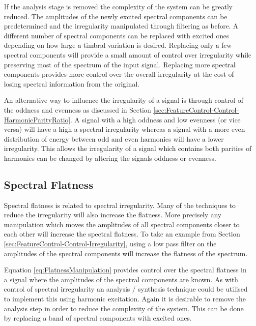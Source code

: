 		If the analysis stage is removed the complexity of the system can be greatly reduced. The amplitudes of the
		newly excited spectral components can be predetermined and the irregularity manipulated through filtering
		as before.  A different number of spectral components can be replaced with excited ones depending on how
		large a timbral variation is desired. Replacing only a few spectral components will provide a small amount
		of control over irregularity while preserving most of the spectrum of the input signal. Replacing more
		spectral components provides more control over the overall irregularity at the cost of losing spectral
		information from the original.

		An alternative way to influence the irregularity of a signal is through control of the oddness and evenness
		as discussed in Section \ref{sec:FeatureControl-Control-HarmonicParityRatio}. A signal with a high oddness
		and low evenness (or vice versa) will have a high a spectral irregularity whereas a signal with a more even
		distribution of energy between odd and even harmonics will have a lower irregularity. This allows the
		irregularity of a signal which contains both parities of harmonics can be changed by altering the signals
		oddness or evenness.

	\subsection{Spectral Flatness}
	\label{sec:FeatureControl-Control-Flatness}
		Spectral flatness is related to spectral irregularity. Many of the techniques to reduce the irregularity
		will also increase the flatness. More precisely any manipulation which moves the amplitudes of all spectral
		components closer to each other will increase the spectral flatness. To take an example from Section
		\ref{sec:FeatureControl-Control-Irregularity}, using a low pass filter on the amplitudes of the spectral
		components will increase the flatness of the spectrum.

		Equation \ref{eq:FlatnessManipulation} provides control over the spectral flatness in a signal where the
		amplitudes of the spectral components are known. As with control of spectral irregularity an analysis /
		synthesis technique could be utilised to implement this using harmonic excitation. Again it is desirable to
		remove the analysis step in order to reduce the complexity of the system. This can be done by replacing a
		band of spectral components with excited ones.

